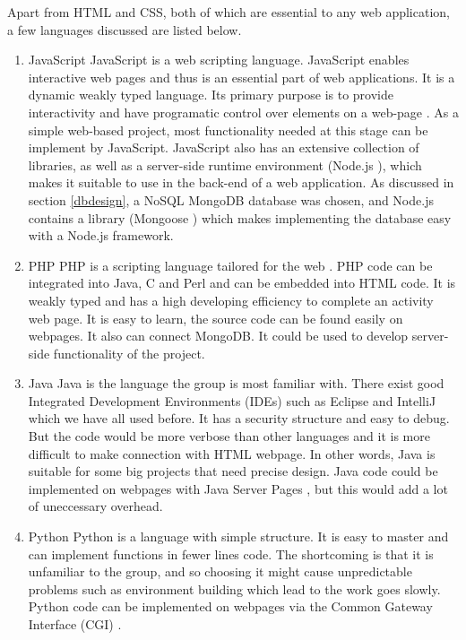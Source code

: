 \documentclass[titlepage]{article}
\begin{document}
Apart from HTML and CSS, both of which are essential to any web application, a few languages discussed are listed below.
\begin{enumerate}
  \item JavaScript
  JavaScript is a web scripting language. JavaScript enables interactive web pages and thus is an essential part of web applications. It is a dynamic\cite{js_datatypes} weakly typed language. Its primary purpose is to provide interactivity and have programatic control over elements on a web-page \cite{jsWhatIsJavascript}. As a simple web-based project, most functionality needed at this stage can be implement by JavaScript. JavaScript also has an extensive collection of libraries, as well as a server-side runtime environment (Node.js \cite{nodejs}), which makes it suitable to use in the back-end of a web application. As discussed in section \ref{dbdesign}, a NoSQL MongoDB database was chosen, and Node.js contains a library (Mongoose \cite{mongoose}) which makes implementing the database easy with a Node.js framework.

  \item PHP
  PHP is a scripting language tailored for the web \cite{php}. PHP code can be integrated into Java, C and Perl and can be embedded into HTML code. It is weakly typed\cite{php_datatypes} and has a high developing efficiency to complete an activity web page. It is easy to learn, the source code can be found easily on webpages. It also can connect MongoDB. It could be used to develop server-side functionality of the project.

  \item Java
  Java is the language the group is most familiar with. There exist good Integrated Development Environments (IDEs) such as Eclipse and IntelliJ which we have all used before. It has a security structure and easy to debug. But the code would be more verbose than other languages and it is more difficult to make connection with HTML webpage. In other words, Java is suitable for some big projects that need precise design. Java code could be implemented on webpages with Java Server Pages \cite{jsp}, but this would add a lot of uneccessary overhead.

  \item Python
  Python is a language with simple structure. It is easy to master and can implement functions in fewer lines code. The shortcoming is that it is unfamiliar to the group, and so choosing it might cause unpredictable problems such as environment building which lead to the work goes slowly. Python code can be implemented on webpages via the Common Gateway Interface (CGI) \cite{python_web}.
\end{enumerate}
\end{document}
